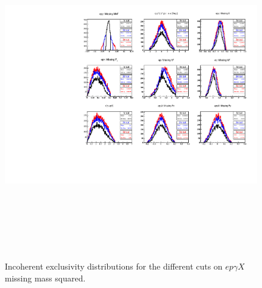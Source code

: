 \begin{enumerate}
\begin{enumerate}
\begin{enumerate}
    \begin{figure}[tbp]
    \includegraphics[height=14.6cm]{fig/all_sigmas_incoh_exc_cuts.pdf}
    \caption{ Incoherent exclusivity distributions for the different cuts on 
    $ep\gamma X$ missing mass squared.}
    \label{fig:exc_InCoh}
    \end{figure}                                                                  



\end{enumerate}
\end{enumerate}
\end{enumerate}
